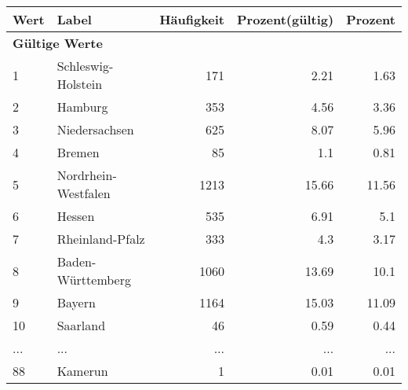      \begin{longtable}{lXrrr}
     \toprule
     \textbf{Wert} & \textbf{Label} & \textbf{Häufigkeit} & \textbf{Prozent(gültig)} & \textbf{Prozent} \\
     \endhead
     \midrule
     \multicolumn{5}{l}{\textbf{Gültige Werte}}\\
        1 & \multicolumn{1}{X}{Schleswig-Holstein} & %
          \num{171} &
          \num[round-mode=places,round-precision=2]{2,21} &
          \num[round-mode=places,round-precision=2]{1,63} \\
        2 & \multicolumn{1}{X}{Hamburg} & %
          \num{353} &
          \num[round-mode=places,round-precision=2]{4,56} &
          \num[round-mode=places,round-precision=2]{3,36} \\
        3 & \multicolumn{1}{X}{Niedersachsen} & %
          \num{625} &
          \num[round-mode=places,round-precision=2]{8,07} &
          \num[round-mode=places,round-precision=2]{5,96} \\
        4 & \multicolumn{1}{X}{Bremen} & %
          \num{85} &
          \num[round-mode=places,round-precision=2]{1,1} &
          \num[round-mode=places,round-precision=2]{0,81} \\
        5 & \multicolumn{1}{X}{Nordrhein-Westfalen} & %
          \num{1213} &
          \num[round-mode=places,round-precision=2]{15,66} &
          \num[round-mode=places,round-precision=2]{11,56} \\
        6 & \multicolumn{1}{X}{Hessen} & %
          \num{535} &
          \num[round-mode=places,round-precision=2]{6,91} &
          \num[round-mode=places,round-precision=2]{5,1} \\
        7 & \multicolumn{1}{X}{Rheinland-Pfalz} & %
          \num{333} &
          \num[round-mode=places,round-precision=2]{4,3} &
          \num[round-mode=places,round-precision=2]{3,17} \\
        8 & \multicolumn{1}{X}{Baden-Württemberg} & %
          \num{1060} &
          \num[round-mode=places,round-precision=2]{13,69} &
          \num[round-mode=places,round-precision=2]{10,1} \\
        9 & \multicolumn{1}{X}{Bayern} & %
          \num{1164} &
          \num[round-mode=places,round-precision=2]{15,03} &
          \num[round-mode=places,round-precision=2]{11,09} \\
        10 & \multicolumn{1}{X}{Saarland} & %
          \num{46} &
          \num[round-mode=places,round-precision=2]{0,59} &
          \num[round-mode=places,round-precision=2]{0,44} \\
       ... & ... & ... & ... & ... \\
        88 & \multicolumn{1}{X}{Kamerun} & %
          \num{1} &
          \num[round-mode=places,round-precision=2]{0,01} &
          \num[round-mode=places,round-precision=2]{0,01} \\


\end{longtable}
